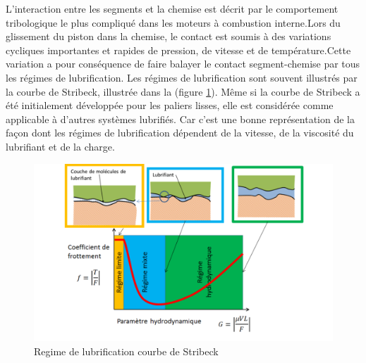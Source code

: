 L'interaction entre les segments et la chemise est décrit par le comportement tribologique le plus compliqué dans les moteurs à combustion interne.Lors du glissement du piston dans la chemise, le contact est soumis à des variations cycliques importantes et rapides de pression, de vitesse et de température.Cette variation a pour conséquence de faire balayer le contact segment-chemise par tous les régimes de lubrification. Les régimes de lubrification sont souvent illustrés par la courbe de Stribeck, illustrée dans la (figure \ref{fig:regime-de-lubrification}). Même si la courbe de Stribeck a été initialement développée pour les paliers lisses, elle est considérée comme applicable à d'autres systèmes lubrifiés.\cite{initiation} Car c'est une bonne représentation de la façon dont les régimes de lubrification dépendent de la vitesse, de la viscosité du lubrifiant et de la charge.

\begin{figure}[h]
	\centering
	\includegraphics[width=0.7\linewidth]{"Img/regime de lubrification"}
	\caption[Courbe de stribeck]{Regime de lubrification courbe de Stribeck}
	\label{fig:regime-de-lubrification}
\end{figure}




